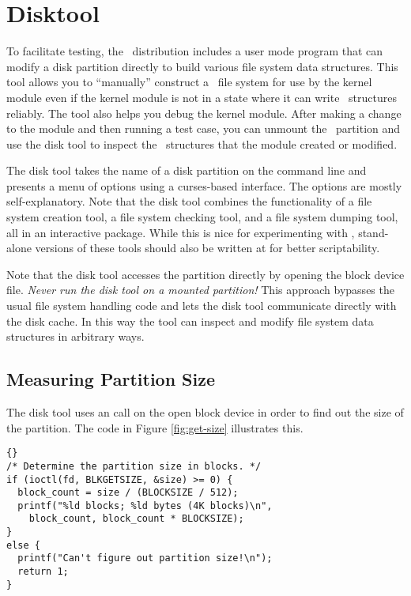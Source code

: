 
\section{Disktool}
\label{sec:disktool}

To facilitate testing, the \GenericFS\ distribution includes a user mode program that can modify
a disk partition directly to build various file system data structures. This tool allows you to
``manually'' construct a \GenericFS\ file system for use by the kernel module even if the kernel
module is not in a state where it can write \GenericFS\ structures reliably. The tool also helps
you debug the kernel module. After making a change to the module and then running a test case,
you can unmount the \GenericFS\ partition and use the disk tool to inspect the \GenericFS\
structures that the module created or modified.

The disk tool takes the name of a disk partition on the command line and presents a menu of
options using a curses-based interface. The options are mostly self-explanatory. Note that the
disk tool combines the functionality of a file system creation tool, a file system checking
tool, and a file system dumping tool, all in an interactive package. While this is nice for
experimenting with \GenericFS, stand-alone versions of these tools should also be written at
for better scriptability.

Note that the disk tool accesses the partition directly by opening the block device file.
\emph{Never run the disk tool on a mounted partition!} This approach bypasses the usual file
system handling code and lets the disk tool communicate directly with the disk cache. In this
way the tool can inspect and modify file system data structures in arbitrary ways.

\subsection{Measuring Partition Size}
\label{sec:disktool-size}

The disk tool uses an  call on the open block device in order to find out the size
of the partition. The code in Figure \ref{fig:get-size} illustrates this.

\begin{figure*}[tp]
  \centering
  \begin{wbigbox}
\begin{lstlisting}{}
/* Determine the partition size in blocks. */
if (ioctl(fd, BLKGETSIZE, &size) >= 0) {
  block_count = size / (BLOCKSIZE / 512);
  printf("%ld blocks; %ld bytes (4K blocks)\n",
    block_count, block_count * BLOCKSIZE);
}
else {
  printf("Can't figure out partition size!\n");
  return 1;
}
\end{lstlisting}
  \end{wbigbox}
  \caption{Getting Partition Size}
  \label{fig:get-size}
\end{figure*}

